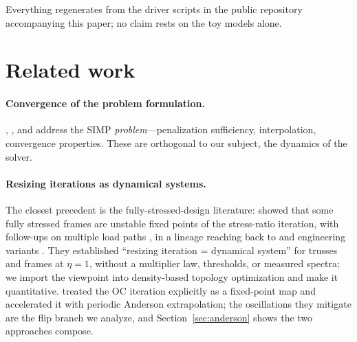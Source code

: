 \documentclass[11pt,a4paper]{article}
\begin{document}
Everything regenerates from the driver scripts in the public repository
accompanying this paper; no claim rests on the toy models alone.

\section{Related work}\label{sec:related}

\paragraph{Convergence of the problem formulation.}
\citet{rietz2001}, \citet{stolpe2001}, and \citet{martinez2005} address
the SIMP \emph{problem}---penalization sufficiency, interpolation,
convergence properties. These are orthogonal to our subject, the
dynamics of the solver.

\paragraph{Resizing iterations as dynamical systems.} The closest
precedent is the fully-stressed-design literature:
\citet{mueller2001} showed that some fully stressed frames are unstable
fixed points of the stress-ratio iteration, with follow-ups on multiple
load paths \citep{mueller2002,liu2003}, in a lineage reaching back to
\citet{razani1965} and engineering variants \citep{patnaik1998mfud}.
They established ``resizing iteration = dynamical system'' for trusses
and frames at $\eta=1$, without a multiplier law, thresholds, or
measured spectra; we import the viewpoint into density-based topology
optimization and make it quantitative. \citet{li2020fixedpoint} treated
the OC iteration explicitly as a fixed-point map and accelerated it with
periodic Anderson extrapolation; the oscillations they mitigate are the
flip branch we analyze, and Section~\ref{sec:anderson} shows the two
approaches compose.
\end{document}
